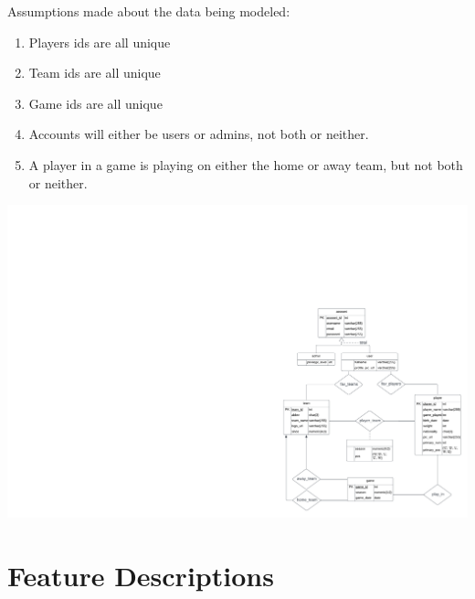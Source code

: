 \documentclass[11pt]{article}
\begin{document}
Assumptions made about the data being modeled:
\begin{enumerate}
    \item Players ids are all unique
    \item Team ids are all unique
    \item Game ids are all unique
    \item Accounts will either be users or admins, not both or neither.
    \item A player in a game is playing on either the home or away team, but not both or neither.
\end{enumerate}

\begin{center}
    \includegraphics[width=1\textwidth]{E_R Diagram.png}
\end{center}

\section{Feature Descriptions}
\end{document}
